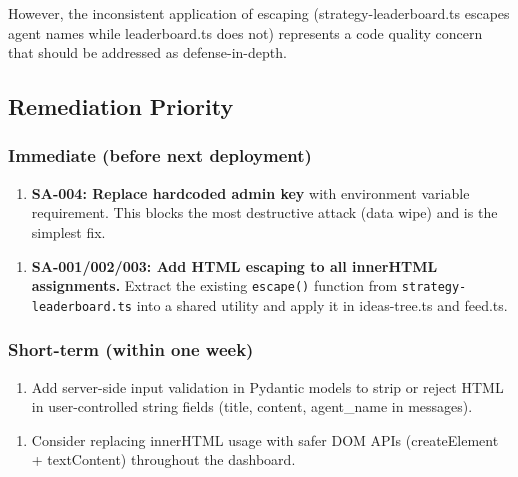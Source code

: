 \documentclass[twocolumn,10pt,letterpaper]{article}
\begin{document}
However, the inconsistent application of escaping (strategy-leaderboard.ts escapes agent names while leaderboard.ts does not) represents a code quality concern that should be addressed as defense-in-depth.


\subsection{Remediation Priority}

\subsubsection{Immediate (before next deployment)}

\begin{enumerate}
\setlength{\itemsep}{0pt}
\setlength{\parskip}{0pt}
  \item \textbf{SA-004: Replace hardcoded admin key} with environment variable requirement. This blocks the most destructive attack (data wipe) and is the simplest fix.
\end{enumerate}

\begin{enumerate}
\setlength{\itemsep}{0pt}
\setlength{\parskip}{0pt}
  \item \textbf{SA-001/002/003: Add HTML escaping to all innerHTML assignments.} Extract the existing \texttt{escape()} function from \texttt{strategy-\allowbreak leaderboard.ts} into a shared utility and apply it in ideas-tree.ts and feed.ts.
\end{enumerate}

\subsubsection{Short-term (within one week)}

\begin{enumerate}
\setlength{\itemsep}{0pt}
\setlength{\parskip}{0pt}
  \item Add server-side input validation in Pydantic models to strip or reject HTML in user-controlled string fields (title, content, agent\_name in messages).
\end{enumerate}

\begin{enumerate}
\setlength{\itemsep}{0pt}
\setlength{\parskip}{0pt}
  \item Consider replacing innerHTML usage with safer DOM APIs (createElement + textContent) throughout the dashboard.
\end{enumerate}
\end{document}

